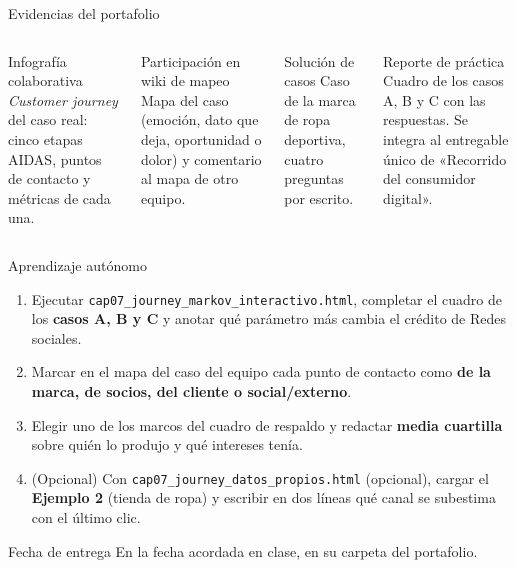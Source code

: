 \documentclass[aspectratio=169,xcolor=dvipsnames]{beamer}
\begin{document}
\begin{frame}{Evidencias del portafolio}
\small
\begin{columns}[T]
  \begin{block}{Infografía colaborativa}
    \scriptsize \textit{Customer journey} del caso real: cinco etapas AIDAS, puntos de contacto y métricas de cada una.
  \end{block}
  \begin{block}{Participación en wiki de mapeo}
    \scriptsize Mapa del caso (emoción, dato que deja, oportunidad o dolor) y comentario al mapa de otro equipo.
  \end{block}
  \begin{block}{Solución de casos}
    \scriptsize Caso de la marca de ropa deportiva, cuatro preguntas por escrito.
  \end{block}
  \begin{block}{Reporte de práctica}
    \scriptsize Cuadro de los casos A, B y C con las respuestas. Se integra al entregable único de «Recorrido del consumidor digital».
  \end{block}
\end{columns}
\end{frame}

\begin{frame}{Aprendizaje autónomo}
\footnotesize
\begin{enumerate}
  \item Ejecutar \texttt{cap07\_journey\_markov\_\allowbreak interactivo.html}, completar el cuadro de los \textbf{casos A, B y C} y anotar qué parámetro más cambia el crédito de Redes sociales.
  \vspace{1pt}
  \item Marcar en el mapa del caso del equipo cada punto de contacto como \textbf{de la marca, de socios, del cliente o social/externo}.
  \vspace{1pt}
  \item Elegir uno de los marcos del cuadro de respaldo y redactar \textbf{media cuartilla} sobre quién lo produjo y qué intereses tenía.
  \vspace{1pt}
  \item (Opcional) Con \texttt{cap07\_journey\_datos\_propios.html} (opcional), cargar el \textbf{Ejemplo 2} (tienda de ropa) y escribir en dos líneas qué canal se subestima con el último clic.
\end{enumerate}
\vspace{2pt}
\begin{alertblock}{Fecha de entrega}
  En la fecha acordada en clase, en su carpeta del portafolio.
\end{alertblock}
\end{frame}
\end{document}
